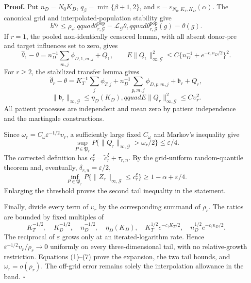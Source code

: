 \textbf{Proof.}
Put \(n_D=N_0K_D\), \(q_\beta=\min\{\beta+1,2\}\), and \(\varepsilon=\varepsilon_{N_0,K_T,K_D}(\alpha)\). The canonical grid and interpolated-population stability give
\[
 h^{q_\beta}\le\rho_r,qquad
 \theta^{\mathrm{pop}}_{r,\mathcal G}=\mathcal L_{\mathcal G}\theta,qquad
 \theta^{\mathrm{pop}}_{r,\mathcal G}(g)=\theta(g).       \tag{1}
\]
If \(r=1\), the pooled non-identically censored lemma, with all absent donor-pre and target influences set to zero, gives
\[
 \widehat\theta_1-\theta=n_D^{-1}\sum_{m,j}\phi_{D,1,m,j}+Q_1,
 \qquad E\|Q_1\|_{\infty,\mathcal G}^2
 \le C\{n_D^{-1}+e^{-c_\dagger n_D/2}\}^2.              \tag{2}
\]
For \(r\ge2\), the stabilized transfer lemma gives
\[
 \widehat\theta_r-\theta
 =K_T^{-1}\sum_j\phi_{T,j}+n_D^{-1}\sum_{p,m,j}\phi_{D,p,m,j}
 +\mathfrak b_r+Q_r,                                      \tag{3}
\]
\[
 \|\mathfrak b_r\|_{\infty,\mathcal G}\le\eta_D(K_D),qquad
 E\|Q_r\|_{\infty,\mathcal G}^2\le C\upsilon_r^2.      \tag{4}
\]
All patient processes are independent and mean zero by patient independence and the martingale constructions.

Since \(\omega_r=C_\omega\varepsilon^{-1/2}\upsilon_r\), a sufficiently large fixed \(C_\omega\) and Markov's inequality give
\[
 \sup_{P\in\mathfrak P_r}P\{\|Q_r\|_{\infty,\mathcal G}>\omega_r/2\}
 \le\varepsilon/4.                                       \tag{5}
\]
The corrected definition has \(c_r^\xi=\widetilde c_r^\xi+\tau_{r,n}\). By the grid-uniform random-quantile theorem and, eventually, \(\delta_{r,n}=\varepsilon/2\),
\[
 \inf_{P\in\mathfrak P_r}P\{\|Z_r\|_{\infty,\mathcal G}\le c_r^\xi\}
 \ge1-\alpha+\varepsilon/4.                              \tag{6}
\]
Enlarging the threshold proves the second tail inequality in the statement.

Finally, divide every term of \(\upsilon_r\) by the corresponding summand of \(\rho_r\). The ratios are bounded by fixed multiples of
\[
 K_T^{-1/2},\quad K_D^{-1/2},\quad n_D^{-1/2},\quad
 \eta_D(K_D),\quad K_T^{1/2}e^{-c_\dagger K_T/2},\quad
 n_D^{1/2}e^{-c_\dagger n_D/2}.                           \tag{7}
\]
The reciprocal of \(\varepsilon\) grows only at an iterated-logarithm rate. Hence \(\varepsilon^{-1/2}\upsilon_r/\rho_r\to0\) uniformly on every three-dimensional tail, with no relative-growth restriction. Equations (1)--(7) prove the expansion, the two tail bounds, and \(\omega_r=o(\rho_r)\). The off-grid error remains solely the interpolation allowance in the band. \(\square\)